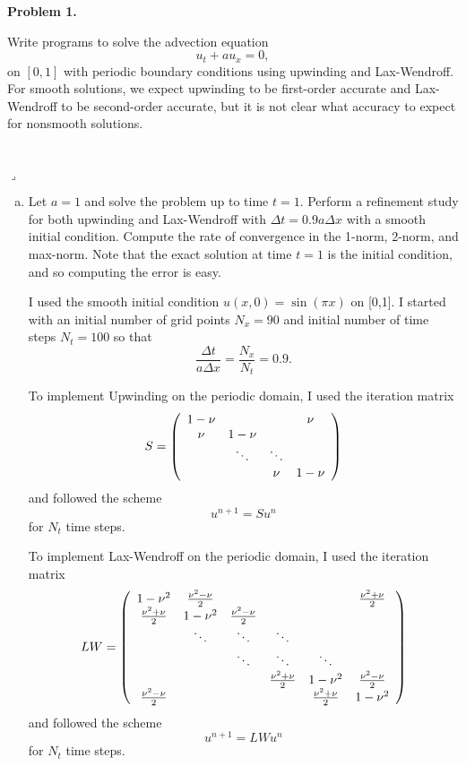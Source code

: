 \documentclass[12pt]{article}
\newenvironment{myprob}[1]
    {%
    \noindent{\Huge$\ulcorner$}\textbf{#1.}\begin{em}
    }
    { 
    \end{em} \\ \hphantom{l} \hfill {\Huge$\lrcorner$} }
\begin{document}
\rhead{\today}

{\let\newpage\relax} 


\begin{myprob}{Problem 1}
Write programs to solve the advection equation
$$u_t + au_x = 0, $$
on $[0,1]$ with periodic boundary conditions using upwinding and Lax-Wendroff.  For smooth solutions, we expect upwinding to be first-order accurate and Lax-Wendroff to be second-order accurate, but it is not clear what accuracy to expect for nonsmooth solutions.
\end{myprob}
\begin{enumerate}[(a)]
\item Let $a=1$ and solve the problem up to time $t=1$.  Perform a refinement study for both upwinding and Lax-Wendroff with $\Delta t=0.9a\Delta x$ with a smooth initial condition.  Compute the rate of convergence in the 1-norm, 2-norm, and max-norm.  Note that the exact solution at time $t=1$ is the initial condition, and so computing the error is easy.

I used the smooth initial condition $u(x,0) = \sin(\pi x)$ on [0,1].  I started with an initial number of grid points $N_x = 90$ and initial number of time steps $N_t = 100$ so that $$\dfrac{\Delta t}{a\Delta x} = \dfrac{N_x}{N_t} = 0.9.$$

To implement Upwinding on the periodic domain, I used the iteration matrix
$$S = \qty(\begin{array}{cccc} 
1-\nu & & &  \nu \\
\nu & 1-\nu & &  \\
& \ddots & \ddots &  \\
& & \nu & 1-\nu
\end{array}) $$
and followed the scheme $$u^{n+1} = S u^{n}$$ for $N_t$ time steps.

To implement Lax-Wendroff on the periodic domain, I used the iteration matrix
$$LW = \qty(\begin{array}{cccccc} 
1-\nu^2 & \frac{\nu^2-\nu}{2} & & & &  \frac{\nu^2+\nu}{2} \\
\frac{\nu^2+\nu}{2} & 1-\nu^2 & \frac{\nu^2-\nu}{2} & & & \\
& \ddots & \ddots & \ddots & & \\
& & \ddots & \ddots & \ddots &  \\
& & & \frac{\nu^2+\nu}{2} & 1-\nu^2 & \frac{\nu^2-\nu}{2} \\
\frac{\nu^2-\nu}{2} & & & & \frac{\nu^2+\nu}{2} & 1-\nu^2
\end{array}) $$
and followed the scheme $$u^{n+1} = LW u^{n}$$ for $N_t$ time steps.


\end{enumerate}
\end{document}
